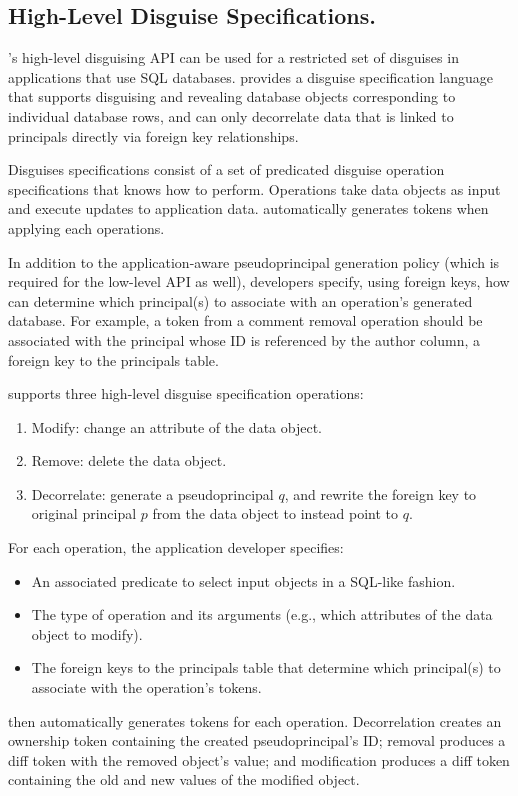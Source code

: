 \subsection{High-Level Disguise Specifications.} 
\sys's high-level disguising API can be used for a restricted set of disguises in applications that
use SQL databases. \sys provides a disguise specification language that supports disguising and
revealing database objects corresponding to individual database rows, and can only decorrelate data
that is linked to principals directly via foreign key relationships.

Disguises specifications consist of a set of predicated disguise operation specifications that \sys knows
how to perform.  Operations take data objects as input and execute updates to
application data. \sys automatically generates tokens when applying each operations.

In addition to the application-aware pseudoprincipal generation policy (which is required for the
low-level API as well), developers specify, using foreign keys, how \sys can determine which
principal(s) to associate with an operation's generated database. For example, a token from a
comment removal operation should be associated with the principal whose ID is referenced by the
author column, a foreign key to the principals table.

\vspace{6pt}\noindent
\sys supports three high-level disguise specification operations:
\begin{enumerate}
    \item Modify: change an attribute of the data object.
    \item Remove: delete the data object.
    \item Decorrelate: generate a pseudoprincipal $q$, and rewrite the foreign key to original
        principal $p$ from the data object to instead point to $q$.  
\end{enumerate}

\noindent For each operation, the application developer specifies:
\begin{itemize}
    \item An associated predicate to select input objects in a SQL-like fashion.
    \item The type of operation and its arguments (e.g., which attributes of the data object to
        modify).
    \item The foreign keys to the principals table that determine which principal(s) to associate
        with the operation's tokens.
\end{itemize}
%
\sys then automatically generates tokens for each operation.
Decorrelation creates an ownership token  containing the created pseudoprincipal's
ID; removal produces a diff token  with the removed object's value; and modification
produces a diff token  containing the old and new values of the modified object.

